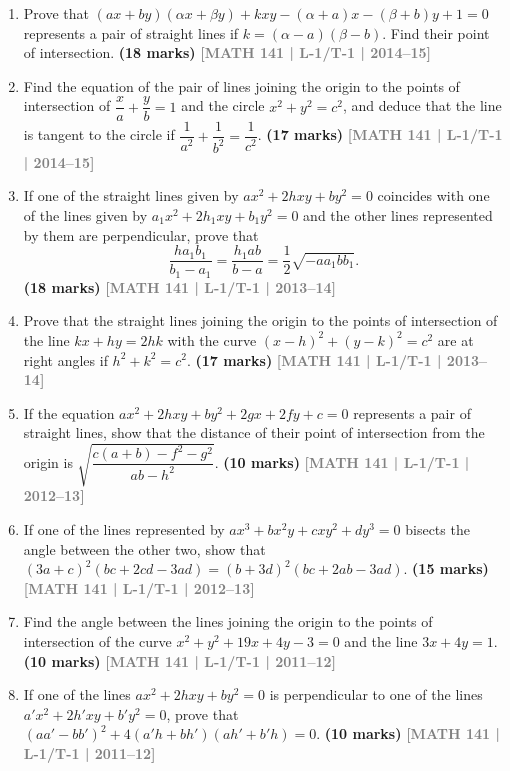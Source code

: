 \documentclass[12pt,a4paper]{article}
\newcommand{\yr}[1]{\hfill\textcolor{gray}{\small\textbf{[#1]}}}
\newcommand{\mk}[1]{\textcolor{orange!70!black}{\small\textbf{(#1 marks)}}}
\begin{document}
\begin{enumerate}
\item Prove that $(ax+by)({\alpha}x+{\beta}y)+kxy-(\alpha+a)x-(\beta+b)y+1=0$ represents a pair of straight lines if $k=(\alpha-a)(\beta-b)$. Find their point of intersection.
\mk{18} \yr{MATH 141 | L-1/T-1 | 2014--15}

\item Find the equation of the pair of lines joining the origin to the points of intersection of $\dfrac{x}{a}+\dfrac{y}{b}=1$ and the circle $x^{2}+y^{2}=c^{2}$, and deduce that the line is tangent to the circle if $\dfrac{1}{a^{2}}+\dfrac{1}{b^{2}}=\dfrac{1}{c^{2}}$.
\mk{17} \yr{MATH 141 | L-1/T-1 | 2014--15}

\item If one of the straight lines given by $ax^{2}+2hxy+by^{2}=0$ coincides with one of the lines given by $a_{1}x^{2}+2h_{1}xy+b_{1}y^{2}=0$ and the other lines represented by them are perpendicular, prove that
\[
\frac{ha_{1}b_{1}}{b_{1}-a_{1}}=\frac{h_{1}ab}{b-a}=\frac{1}{2}\sqrt{-aa_{1}bb_{1}}.
\]
\mk{18} \yr{MATH 141 | L-1/T-1 | 2013--14}

\item Prove that the straight lines joining the origin to the points of intersection of the line $kx+hy=2hk$ with the curve $(x-h)^{2}+(y-k)^{2}=c^{2}$ are at right angles if $h^{2}+k^{2}=c^{2}$.
\mk{17} \yr{MATH 141 | L-1/T-1 | 2013--14}

\item If the equation $ax^{2}+2hxy+by^{2}+2gx+2fy+c=0$ represents a pair of straight lines, show that the distance of their point of intersection from the origin is $\sqrt{\dfrac{c(a+b)-f^{2}-g^{2}}{ab-h^{2}}}$.
\mk{10} \yr{MATH 141 | L-1/T-1 | 2012--13}

\item If one of the lines represented by $ax^{3}+bx^{2}y+cxy^{2}+dy^{3}=0$ bisects the angle between the other two, show that $(3a+c)^{2}(bc+2cd-3ad)=(b+3d)^{2}(bc+2ab-3ad)$.
\mk{15} \yr{MATH 141 | L-1/T-1 | 2012--13}

\item Find the angle between the lines joining the origin to the points of intersection of the curve $x^{2}+y^{2}+19x+4y-3=0$ and the line $3x+4y=1$.
\mk{10} \yr{MATH 141 | L-1/T-1 | 2011--12}

\item If one of the lines $ax^{2}+2hxy+by^{2}=0$ is perpendicular to one of the lines $a'x^{2}+2h'xy+b'y^{2}=0$, prove that $(aa'-bb')^{2}+4(a'h+bh')(ah'+b'h)=0$.
\mk{10} \yr{MATH 141 | L-1/T-1 | 2011--12}


\end{enumerate}
\end{document}
